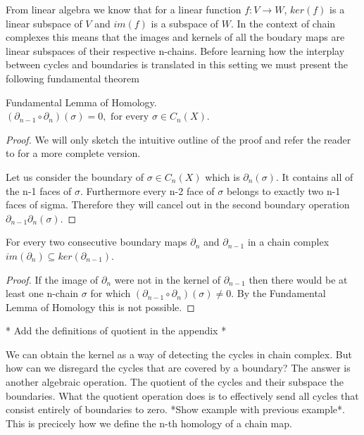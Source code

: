 From linear algebra we know that for a linear function $f: V \to W$, $ker(f)$ is a linear subspace of $V$ and $im(f)$ is a subspace of $W$. In the context of chain complexes this means that the images and kernels of all the boudary maps are linear subspaces of their respective n-chains. Before learning how the interplay between cycles and boundaries is translated in this setting we must present the following fundamental theorem

\begin{lem} Fundamental Lemma of Homology. $(\partial_{n-1} \circ \partial_n) (\sigma) = 0, \text{ for every } \sigma \in C_{n}(X)$. \end{lem}

\begin{proof}
    We will only sketch the intuitive outline of the proof and refer the reader to \cite{algebraic-topology} for a more complete version.

    Let us consider the boundary of $\sigma \in C_n(X)$ which is $\partial_n(\sigma)$. It contains all of the n-1 faces of $\sigma$. Furthermore every n-2 face of $\sigma$ belongs to exactly two n-1 faces of sigma. Therefore they will cancel out in the second boundary operation $\partial_{n-1}\partial_n(\sigma)$.
\end{proof}


\begin{cor}  For every two consecutive boundary maps $\partial_n$ and $\partial_{n-1}$ in a chain complex $im(\partial_n) \subseteq ker(\partial_{n-1})$. \end{cor}

\begin{proof}
    If the image of $\partial_n$ were not in the kernel of $\partial_{n-1}$ then there would be at least one n-chain $\sigma$ for which $(\partial_{n-1} \circ \partial_n) (\sigma) \ne 0$. By the Fundamental Lemma of Homology this is not possible.
\end{proof}


* Add the definitions of quotient in the appendix *

We can obtain the kernel as a way of detecting the cycles in chain complex. But how can we disregard the cycles that are covered by a boundary? The answer is another algebraic operation. The quotient of the cycles and their subspace the boundaries. What the quotient operation does is to effectively send all cycles that consist entirely of boundaries to zero. *Show example with previous example*. This is precicely how we define the n-th homology of a chain map.


